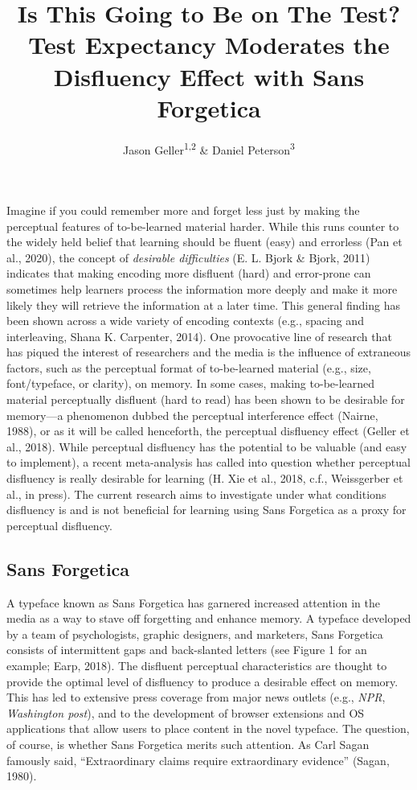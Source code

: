\documentclass[
  english,
  jou]{apa7}
\title{Is This Going to Be on The Test? Test Expectancy Moderates the Disfluency Effect with Sans Forgetica}
\author{Jason Geller\textsuperscript{1,2} \& Daniel Peterson\textsuperscript{3}}
\date{}
\affiliation{\vspace{0.5cm}\textsuperscript{1} University of Iowa\\\textsuperscript{2} Rutgers University Center for Cognitive Science\\\textsuperscript{3} Skidmore College}
\begin{document}
\maketitle

Imagine if you could remember more and forget less just by making the perceptual features of to-be-learned material harder. While this runs counter to the widely held belief that learning should be fluent (easy) and errorless (Pan et al., 2020), the concept of \emph{desirable difficulties} (E. L. Bjork \& Bjork, 2011) indicates that making encoding more disfluent (hard) and error-prone can sometimes help learners process the information more deeply and make it more likely they will retrieve the information at a later time. This general finding has been shown across a wide variety of encoding contexts (e.g., spacing and interleaving, Shana K. Carpenter, 2014). One provocative line of research that has piqued the interest of researchers and the media is the influence of extraneous factors, such as the perceptual format of to-be-learned material (e.g., size, font/typeface, or clarity), on memory. In some cases, making to-be-learned material perceptually disfluent (hard to read) has been shown to be desirable for memory---a phenomenon dubbed the perceptual interference effect (Nairne, 1988), or as it will be called henceforth, the perceptual disfluency effect (Geller et al., 2018). While perceptual disfluency has the potential to be valuable (and easy to implement), a recent meta-analysis has called into question whether perceptual disfluency is really desirable for learning (H. Xie et al., 2018, c.f., Weissgerber et al., in press). The current research aims to investigate under what conditions disfluency is and is not beneficial for learning using Sans Forgetica as a proxy for perceptual disfluency.

\hypertarget{sans-forgetica}{%
\subsection{Sans Forgetica}\label{sans-forgetica}}

A typeface known as Sans Forgetica has garnered increased attention in the media as a way to stave off forgetting and enhance memory. A typeface developed by a team of psychologists, graphic designers, and marketers, Sans Forgetica consists of intermittent gaps and back-slanted letters (see Figure 1 for an example; Earp, 2018). The disfluent perceptual characteristics are thought to provide the optimal level of disfluency to produce a desirable effect on memory. This has led to extensive press coverage from major news outlets (e.g., \emph{NPR}, \emph{Washington post}), and to the development of browser extensions and OS applications that allow users to place content in the novel typeface. The question, of course, is whether Sans Forgetica merits such attention. As Carl Sagan famously said, ``Extraordinary claims require extraordinary evidence'' (Sagan, 1980).
\end{document}
